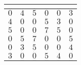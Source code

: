 \begin{table}[!tbp]
\begin{center}
\begin{tabular}{rrrrrr}
\hline\hline
\multicolumn{1}{c}{}&\multicolumn{1}{c}{}&\multicolumn{1}{c}{}&\multicolumn{1}{c}{}&\multicolumn{1}{c}{}&\multicolumn{1}{c}{}\tabularnewline
\hline
$0$&$4$&$5$&$0$&$0$&$3$\tabularnewline
$4$&$0$&$0$&$5$&$3$&$0$\tabularnewline
$5$&$0$&$0$&$7$&$5$&$0$\tabularnewline
$0$&$5$&$7$&$0$&$0$&$5$\tabularnewline
$0$&$3$&$5$&$0$&$0$&$4$\tabularnewline
$3$&$0$&$0$&$5$&$4$&$0$\tabularnewline
\hline
\end{tabular}\end{center}
\end{table}
